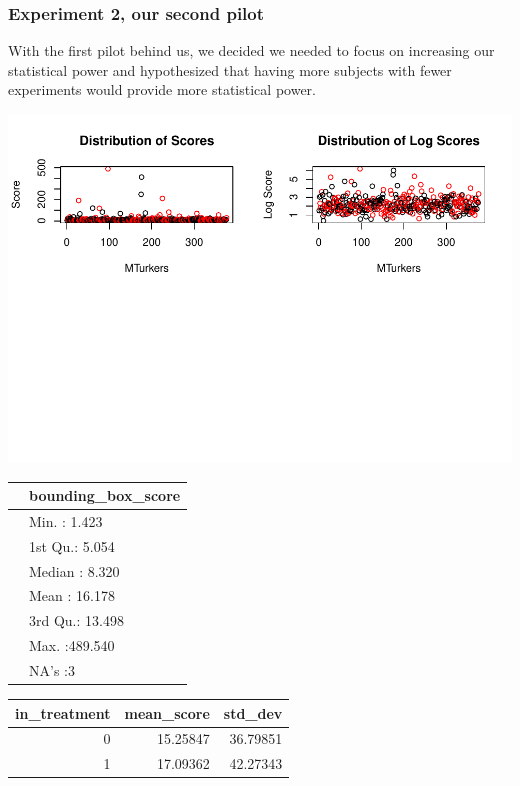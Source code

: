 \documentclass[
]{article}
\begin{document}
\hypertarget{experiment-2-our-second-pilot}{%
\subsubsection{Experiment 2, our second
pilot}\label{experiment-2-our-second-pilot}}

With the first pilot behind us, we decided we needed to focus on
increasing our statistical power and hypothesized that having more
subjects with fewer experiments would provide more statistical power.

\includegraphics{team_mturk_experiments_files/figure-latex/plot_experiment_2-1.pdf}

\begin{tabular}{l|l}
\hline
  & bounding\_box\_score\\
\hline
 & Min.   :  1.423\\
\hline
 & 1st Qu.:  5.054\\
\hline
 & Median :  8.320\\
\hline
 & Mean   : 16.178\\
\hline
 & 3rd Qu.: 13.498\\
\hline
 & Max.   :489.540\\
\hline
 & NA's   :3\\
\hline
\end{tabular}

\begin{tabular}{r|r|r}
\hline
in\_treatment & mean\_score & std\_dev\\
\hline
0 & 15.25847 & 36.79851\\
\hline
1 & 17.09362 & 42.27343\\
\hline
\end{tabular}
\end{document}
